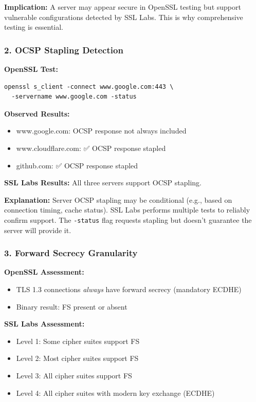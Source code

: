 \documentclass[12pt,a4paper]{article}
\begin{document}
\textbf{Implication:} A server may appear secure in OpenSSL testing but support vulnerable configurations detected by SSL Labs. This is why comprehensive testing is essential.

\subsubsection{2. OCSP Stapling Detection}

\textbf{OpenSSL Test:}
\begin{lstlisting}[style=bashstyle]
openssl s_client -connect www.google.com:443 \
  -servername www.google.com -status
\end{lstlisting}

\textbf{Observed Results:}
\begin{itemize}
    \item www.google.com: OCSP response not always included
    \item www.cloudflare.com: ✅ OCSP response stapled
    \item github.com: ✅ OCSP response stapled
\end{itemize}

\textbf{SSL Labs Results:}
All three servers support OCSP stapling.

\textbf{Explanation:} Server OCSP stapling may be conditional (e.g., based on connection timing, cache status). SSL Labs performs multiple tests to reliably confirm support. The \texttt{-status} flag requests stapling but doesn't guarantee the server will provide it.

\subsubsection{3. Forward Secrecy Granularity}

\textbf{OpenSSL Assessment:}
\begin{itemize}
    \item TLS 1.3 connections \textit{always} have forward secrecy (mandatory ECDHE)
    \item Binary result: FS present or absent
\end{itemize}

\textbf{SSL Labs Assessment:}
\begin{itemize}
    \item Level 1: Some cipher suites support FS
    \item Level 2: Most cipher suites support FS  
    \item Level 3: All cipher suites support FS
    \item Level 4: All cipher suites with modern key exchange (ECDHE)
\end{itemize}
\end{document}
